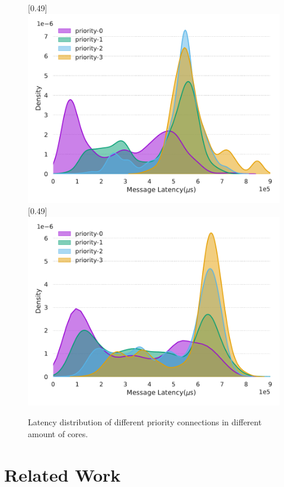 \documentclass[conference]{IEEEtran}
\begin{document}
\begin{figure}[tbp]
    \centering
    [0.49\linewidth]
    {
      \includegraphics[width=\linewidth]{assets/prio-core2.pdf}
    }
    [0.49\linewidth]
    {
      \includegraphics[width=\linewidth]{assets/prio-core4.pdf}
    }
    \caption{Latency distribution of different priority connections in different amount of cores.}
    \label{fig:prio-cores}
    \vspace{-1em}
\end{figure}

\section{Related Work}
\label{section: Related Work}
\end{document}
